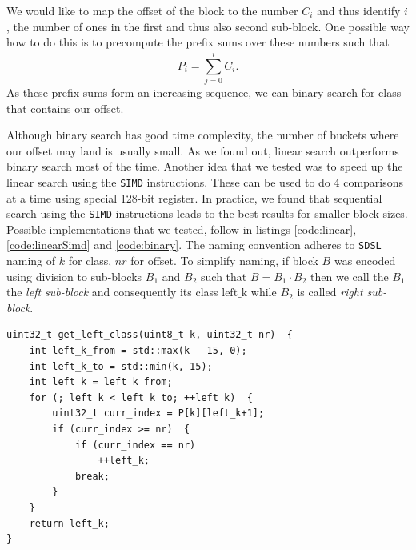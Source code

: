 We would like to map the offset of the block to the number $C_i$ and thus identify $i$,
the number of ones in the first and thus also second sub-block. One possible way how to
do this is to precompute the prefix sums over these numbers such that $$P_i = \sum_{j=0}^{i} C_i.$$
As these prefix sums form an increasing sequence, we can binary search for class that contains our offset.

Although binary search has good time complexity, the number of buckets where our offset
may land is usually small. As we found out, linear search outperforms binary search most
of the time. Another idea that we tested was to speed up the linear search using the
\texttt{SIMD} instructions. These can be used to do 4 comparisons at a time using special
128-bit register. In practice, we found that sequential search using the \texttt{SIMD}
instructions leads to the best results for smaller block sizes. Possible implementations
that we tested, follow in listings \ref{code:linear}, \ref{code:linearSimd} and \ref{code:binary}.
The naming convention adheres to \texttt{SDSL} naming of $k$ for class, $nr$ for offset.
To simplify naming, if block $B$ was encoded using division to sub-blocks $B_1$ and
$B_2$ such that $B=B_1\cdot B_2$ then we call the $B_1$ the \textit{left sub-block} and
consequently its class $\text{left\_k}$ while $B_2$ is called \textit{right sub-block}.

\begin{lstlisting}
uint32_t get_left_class(uint8_t k, uint32_t nr)  {
	int left_k_from = std::max(k - 15, 0);
	int left_k_to = std::min(k, 15);
	int left_k = left_k_from;
	for (; left_k < left_k_to; ++left_k)  {
		uint32_t curr_index = P[k][left_k+1];
		if (curr_index >= nr)  {
			if (curr_index == nr)
				++left_k;
			break;
		}
	}
	return left_k;
}
\end{lstlisting}

